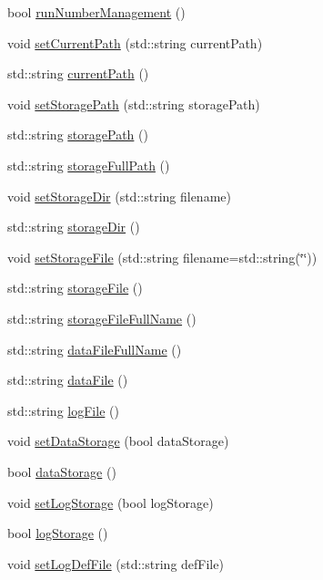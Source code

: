 \begin{DoxyCompactItemize}
bool \hyperlink{classOptions_a7654a2c3d67baae08f61edc18bec367e}{runNumberManagement} ()
\item 
void \hyperlink{classOptions_a3cebd8308183414ef2e0de0e7922c87a}{setCurrentPath} (std::string currentPath)
\item 
std::string \hyperlink{classOptions_ab9cf7442a712fe8593f6cf5cfff36a5d}{currentPath} ()
\item 
void \hyperlink{classOptions_a8c32e222956c77ed2ec5387318f91394}{setStoragePath} (std::string storagePath)
\item 
std::string \hyperlink{classOptions_a3992b9247441a3e60e55c8c5fe32b394}{storagePath} ()
\item 
std::string \hyperlink{classOptions_aa5fe6b85088f3012226869480790a383}{storageFullPath} ()
\item 
void \hyperlink{classOptions_aed5e6919526bcfa5cf4961230bd20e37}{setStorageDir} (std::string filename)
\item 
std::string \hyperlink{classOptions_a5e8026ed2674f8f5db444b52fea27fda}{storageDir} ()
\item 
void \hyperlink{classOptions_ac163281337998af5ca3b7a9617337fef}{setStorageFile} (std::string filename=std::string(\char`\"{}\char`\"{}))
\item 
std::string \hyperlink{classOptions_a6661fe4edd501f7e97527b8f9354ef84}{storageFile} ()
\item 
std::string \hyperlink{classOptions_a68c501133588cd4b1c80219adb926e8d}{storageFileFullName} ()
\item 
std::string \hyperlink{classOptions_ab1cd9f237e9c18fd72323c74565453f8}{dataFileFullName} ()
\item 
std::string \hyperlink{classOptions_a166984c16a957bf2e8e0f0a1ce39eb73}{dataFile} ()
\item 
std::string \hyperlink{classOptions_a739a9b788fc937ad55d10d6b47ff1e8c}{logFile} ()
\item 
void \hyperlink{classOptions_ae6f39f4b0b4bd260fbb5a2f0b5f4786e}{setDataStorage} (bool dataStorage)
\item 
bool \hyperlink{classOptions_aed7799d10139fa542055b982cb820192}{dataStorage} ()
\item 
void \hyperlink{classOptions_a96f0288f5317cf371589f4db07e913b0}{setLogStorage} (bool logStorage)
\item 
bool \hyperlink{classOptions_a33735fffe17485937ab7579d8716b7ee}{logStorage} ()
\item 
void \hyperlink{classOptions_a52e2995912a71f51c230dd6bf28b6a94}{setLogDefFile} (std::string defFile)

\end{DoxyCompactItemize}
